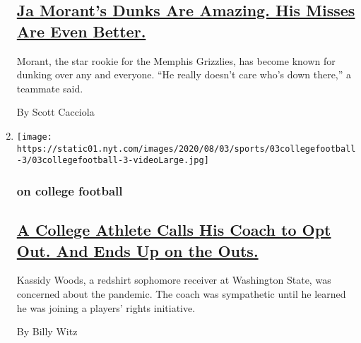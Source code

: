 \begin{enumerate}
  \hypertarget{ja-morants-dunks-are-amazing-his-misses-are-even-better}{%
  \subsection{\texorpdfstring{\href{/2020/08/03/sports/basketball/ja-morant-grizzlies-dunks.html}{Ja
  Morant's Dunks Are Amazing. His Misses Are Even
  Better.}}{Ja Morant's Dunks Are Amazing. His Misses Are Even Better.}}\label{ja-morants-dunks-are-amazing-his-misses-are-even-better}}

  Morant, the star rookie for the Memphis Grizzlies, has become known
  for dunking over any and everyone. ``He really doesn't care who's down
  there,'' a teammate said.

  By Scott Cacciola
\item
  \texttt{[image: https://static01.nyt.com/images/2020/08/03/sports/03collegefootball-3/03collegefootball-3-videoLarge.jpg]}

  \hypertarget{on-college-football}{%
  \subsubsection{on college football}\label{on-college-football}}

  \hypertarget{a-college-athlete-calls-his-coach-to-opt-out-and-ends-up-on-the-outs}{%
  \subsection{\texorpdfstring{\href{/2020/08/03/sports/coronavirus-college-athletes-opt-out.html}{A
  College Athlete Calls His Coach to Opt Out. And Ends Up on the
  Outs.}}{A College Athlete Calls His Coach to Opt Out. And Ends Up on the Outs.}}\label{a-college-athlete-calls-his-coach-to-opt-out-and-ends-up-on-the-outs}}

  Kassidy Woods, a redshirt sophomore receiver at Washington State, was
  concerned about the pandemic. The coach was sympathetic until he
  learned he was joining a players' rights initiative.

  By Billy Witz
\end{enumerate}

